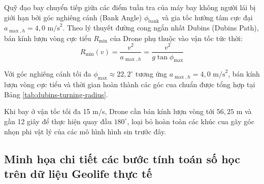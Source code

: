 \hspace{0.5cm} Quỹ đạo bay chuyển tiếp giữa các điểm tuần tra của máy bay không người lái bị giới hạn bởi góc nghiêng cánh (Bank Angle) $\phi_{\text{bank}}$ và gia tốc hướng tâm cực đại $a_{\max, h} = 4{,}0\text{ m/s}^2$. Theo lý thuyết đường cong ngắn nhất Dubins (Dubins Path), bán kính lượn vòng cực tiểu $R_{\min}$ của Drone phụ thuộc vào vận tốc tức thời:
\begin{equation}
R_{\min}(v) = \frac{v^2}{a_{\max, h}} = \frac{v^2}{g \tan\phi_{\max}}
\label{eq:dubins-min-radius}
\end{equation}

Với góc nghiêng cánh tối đa $\phi_{\max} \approx 22{,}2^\circ$ tương ứng $a_{\max, h} = 4{,}0\text{ m/s}^2$, bán kính lượn vòng cực tiểu và thời gian hoàn thành các góc cua chuẩn được tổng hợp tại Bảng \ref{tab:dubins-turning-radius}.

\begin{table}[H]
\centering
\caption{Bán kính lượn vòng cực tiểu và thời gian quay vòng của Drone theo vận tốc}
\label{tab:dubins-turning-radius}
\end{table}

Khi bay ở vận tốc tối đa 15 m/s, Drone cần bán kính lượn vòng tới $56{,}25$ m và gần 12 giây để thực hiện quay đầu $180^\circ$, loại bỏ hoàn toàn các khúc cua gãy góc nhọn phi vật lý của các mô hình hình sin trước đây.

\subsection{Minh họa chi tiết các bước tính toán số học trên dữ liệu Geolife thực tế}

